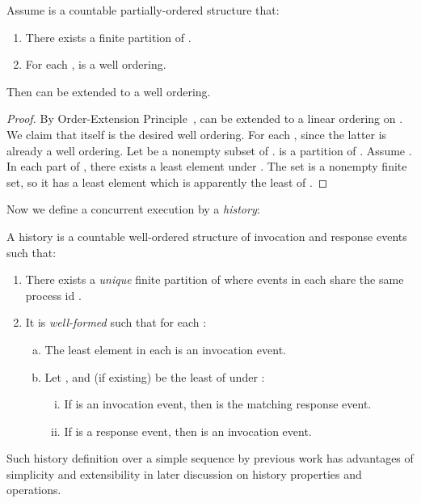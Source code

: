 \documentclass[a4paper,USenglish]{lipics-v2016}
\begin{document}
\begin{lemma}\label{par_to_well}
	Assume  is a countable partially-ordered structure that:
	\begin{enumerate}[(1)]
		\item
		There exists a finite partition  of .
		\item
		For each ,  is a well ordering. 
	\end{enumerate}
	Then  can be extended to a well ordering.
\end{lemma}
\begin{proof}
	By Order-Extension Principle~\cite{Szpilrajn30},  can be extended to a linear ordering  on .
	We claim that  itself is the desired well ordering.
	For each , 
	since the latter is already a well ordering.
	Let  be a nonempty subset of .
	 is a partition of .
	Assume .
	In each part of , there exists a least element  under .
	The set  is a nonempty finite set,
	so it has a least element  which is apparently the least of .
\end{proof}


Now we define a concurrent execution by a \textit{history}:
\begin{definition}\label{def_his}
	A history  is a countable well-ordered structure  of invocation and response events such that:
	\begin{enumerate}[(1)]
		\item
		There exists a \textit{unique} finite partition  of 
		where events in each  share the same process id .
		\item
		It is \textit{well-formed} such that for each :
		\begin{enumerate}[(a)]
			\item
			The least element in each  is an invocation event.
			\item
			Let , and  (if existing) be the least of  under :
			\begin{enumerate}[(i)]
				\item
				If  is an invocation event, then  is the matching response event.
				\item
				If  is a response event, then  is an invocation event.
			\end{enumerate}
		\end{enumerate}
	\end{enumerate}
\end{definition}
Such history definition over a simple sequence by previous work has advantages of simplicity and extensibility 
in later discussion on history properties and operations.
\end{document}
